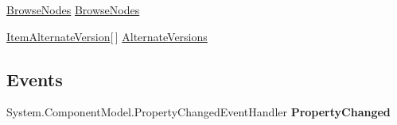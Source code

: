 \begin{DoxyCompactItemize}
\begin{DoxyCompactList}\small\item\em \end{DoxyCompactList}\item 
\hypertarget{class_price___comparison_1_1amazon_1_1ecs_1_1_item_a5e0a80542f0465466f20122b8b49e86e}{\hyperlink{class_price___comparison_1_1amazon_1_1ecs_1_1_browse_nodes}{Browse\-Nodes} \hyperlink{class_price___comparison_1_1amazon_1_1ecs_1_1_item_a5e0a80542f0465466f20122b8b49e86e}{Browse\-Nodes}}\label{class_price___comparison_1_1amazon_1_1ecs_1_1_item_a5e0a80542f0465466f20122b8b49e86e}

\begin{DoxyCompactList}\small\item\em \end{DoxyCompactList}\item 
\hypertarget{class_price___comparison_1_1amazon_1_1ecs_1_1_item_a95bc826fc01159c8225426eda7c4c2fa}{\hyperlink{class_price___comparison_1_1amazon_1_1ecs_1_1_item_alternate_version}{Item\-Alternate\-Version}\mbox{[}$\,$\mbox{]} \hyperlink{class_price___comparison_1_1amazon_1_1ecs_1_1_item_a95bc826fc01159c8225426eda7c4c2fa}{Alternate\-Versions}}\label{class_price___comparison_1_1amazon_1_1ecs_1_1_item_a95bc826fc01159c8225426eda7c4c2fa}

\begin{DoxyCompactList}\small\item\em \end{DoxyCompactList}\end{DoxyCompactItemize}
\subsection*{Events}
\begin{DoxyCompactItemize}
\item 
\hypertarget{class_price___comparison_1_1amazon_1_1ecs_1_1_item_a233d4a690e7a50075c180c136cb32a5e}{System.\-Component\-Model.\-Property\-Changed\-Event\-Handler {\bfseries Property\-Changed}}\label{class_price___comparison_1_1amazon_1_1ecs_1_1_item_a233d4a690e7a50075c180c136cb32a5e}

\end{DoxyCompactItemize}
